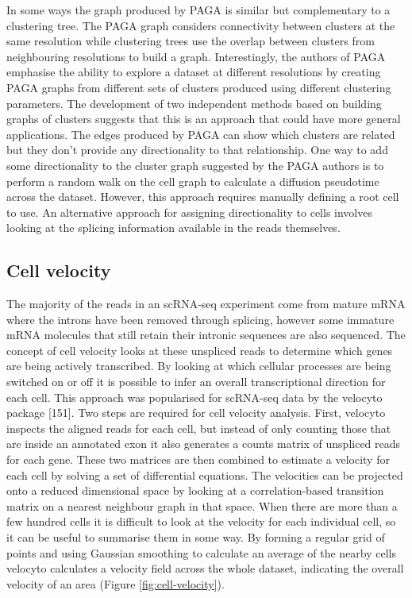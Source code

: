 \documentclass[11pt,a4paper,titlepage,twoside,openright]{style/unimelbthesis}
\theoremstyle{definition}
\theoremstyle{definition}
\theoremstyle{definition}
\theoremstyle{remark}
\begin{document}
\begin{mainmatter}
In some ways the graph produced by PAGA is similar but complementary to a clustering tree. The PAGA graph considers connectivity between clusters at the same resolution while clustering trees use the overlap between clusters from neighbouring resolutions to build a graph. Interestingly, the authors of PAGA emphasise the ability to explore a dataset at different resolutions by creating PAGA graphs from different sets of clusters produced using different clustering parameters. The development of two independent methods based on building graphs of clusters suggests that this is an approach that could have more general applications. The edges produced by PAGA can show which clusters are related but they don't provide any directionality to that relationship. One way to add some directionality to the cluster graph suggested by the PAGA authors is to perform a random walk on the cell graph to calculate a diffusion pseudotime across the dataset. However, this approach requires manually defining a root cell to use. An alternative approach for assigning directionality to cells involves looking at the splicing information available in the reads themselves.

\FloatBarrier

\hypertarget{cell-velocity}{%
\subsection{Cell velocity}\label{cell-velocity}}

The majority of the reads in an scRNA-seq experiment come from mature mRNA where the introns have been removed through splicing, however some immature mRNA molecules that still retain their intronic sequences are also sequenced. The concept of cell velocity looks at these unspliced reads to determine which genes are being actively transcribed. By looking at which cellular processes are being switched on or off it is possible to infer an overall transcriptional direction for each cell. This approach was popularised for scRNA-seq data by the velocyto package {[}151{]}. Two steps are required for cell velocity analysis. First, velocyto inspects the aligned reads for each cell, but instead of only counting those that are inside an annotated exon it also generates a counts matrix of unspliced reads for each gene. These two matrices are then combined to estimate a velocity for each cell by solving a set of differential equations. The velocities can be projected onto a reduced dimensional space by looking at a correlation-based transition matrix on a nearest neighbour graph in that space. When there are more than a few hundred cells it is difficult to look at the velocity for each individual cell, so it can be useful to summarise them in some way. By forming a regular grid of points and using Gaussian smoothing to calculate an average of the nearby cells velocyto calculates a velocity field across the whole dataset, indicating the overall velocity of an area (Figure \ref{fig:cell-velocity}).


\end{mainmatter}
\end{document}
